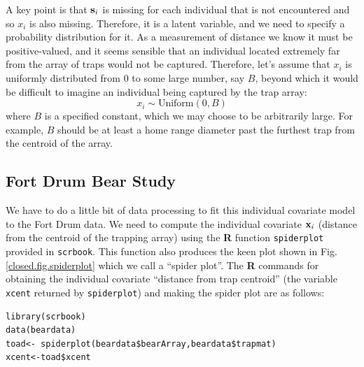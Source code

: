  A key point is that
${\bf s}_{i}$ is missing for each individual that is not encountered
and so  $x_{i}$ is also missing. Therefore, it is a latent variable,
and we need  to specify a probability distribution
for it.  As a measurement of distance we know it must be
positive-valued, and it seems sensible that an individual located
extremely far from the array of traps would not be captured.
Therefore, let's assume that $x_{i}$ is uniformly distributed from $0$ to some large number,
say $B$, beyond which it would be difficult to imagine an
individual being captured by the trap array:
\[
 x_{i} \sim \mbox{Uniform}(0,B)
\]
where $B$ is a specified constant, which we may choose to be
arbitrarily large.
For example, $B$ should be at least a home
range diameter past the furthest trap from the centroid of the array.


\subsection{Fort Drum Bear Study}


We have to do a little bit of data processing to fit this individual
covariate model to the Fort Drum data.  We need to compute the
individual covariate ${\bf x}_{i}$ (distance from the centroid of the
trapping array) using the {\bf R} function \mbox{\tt spiderplot}
provided in \mbox{\tt scrbook}. This function also produces the keen
plot shown in Fig. \ref{closed.fig.spiderplot} which we call a
``spider plot''.  The {\bf R} commands for obtaining the individual
covariate ``distance from trap centroid'' (the variable \mbox{\tt
  xcent} returned by \mbox{\tt spiderplot}) and making the spider plot
are as follows:
\begin{verbatim}
library(scrbook)
data(beardata)
toad<- spiderplot(beardata$bearArray,beardata$trapmat)
xcent<-toad$xcent
\end{verbatim}

